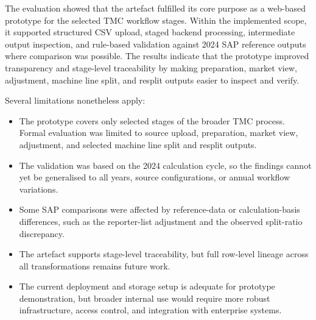 The evaluation showed that the artefact fulfilled its core purpose as a web-based prototype for the selected TMC workflow stages. Within the implemented scope, it supported structured CSV upload, staged backend processing, intermediate output inspection, and rule-based validation against 2024 SAP reference outputs where comparison was possible. The results indicate that the prototype improved transparency and stage-level traceability by making preparation, market view, adjustment, machine line split, and resplit outputs easier to inspect and verify.

Several limitations nonetheless apply:
\begin{itemize}
    \item The prototype covers only selected stages of the broader TMC process. Formal evaluation was limited to source upload, preparation, market view, adjustment, and selected machine line split and resplit outputs.
    \item The validation was based on the 2024 calculation cycle, so the findings cannot yet be generalised to all years, source configurations, or annual workflow variations.
    \item Some SAP comparisons were affected by reference-data or calculation-basis differences, such as the reporter-list adjustment and the observed split-ratio discrepancy.
    \item The artefact supports stage-level traceability, but full row-level lineage across all transformations remains future work.
    \item The current deployment and storage setup is adequate for prototype demonstration, but broader internal use would require more robust infrastructure, access control, and integration with enterprise systems.
\end{itemize}






